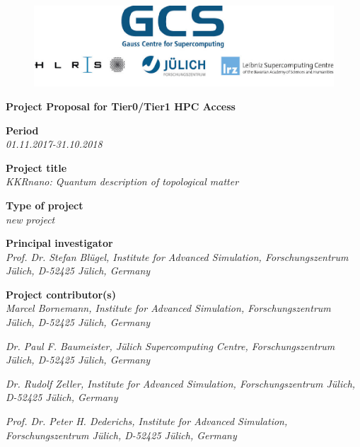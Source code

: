 \documentclass [a4paper, 12pt]{article}
\begin{document}
 
\begin{figure}[H]
\begin{center}
  \includegraphics[scale=0.45]{Figures/GCS-hlrs-fzj-lrz.jpg}\\
\end{center}
\end{figure}

\begin{center}
{\LARGE \bf Project Proposal for Tier0/Tier1 HPC Access} \\

\bigskip
\bigskip
\bigskip
\end{center}
\textbf{Period}\\
\phantom{MM}\textit{01.11.2017-31.10.2018}

\bigskip
\textbf{Project title}\\
\phantom{MM}\textit{KKRnano: Quantum description of topological matter}

\bigskip
\textbf{Type of project}\\
\phantom{MM} \textit{new project}


\bigskip
\textbf{Principal investigator}\\
\phantom{MM} \textit{ Prof. Dr. Stefan Bl{\"u}gel,
Institute for Advanced Simulation, Forschungszentrum J\"ulich, D-52425 J\"ulich, Germany
}

\bigskip
\textbf{Project contributor(s)}\\

\phantom{MM} \textit{Marcel Bornemann,
Institute for Advanced Simulation, Forschungszentrum J\"ulich, D-52425 J\"ulich, Germany
}

\phantom{MM} \textit{Dr. Paul F. Baumeister,
J\"ulich Supercomputing Centre, Forschungszentrum J\"ulich, D-52425 J\"ulich, Germany
}


\phantom{MM} \textit{Dr. Rudolf Zeller,
Institute for Advanced Simulation, Forschungszentrum J\"ulich, D-52425 J\"ulich, Germany
}

\phantom{MM} \textit{Prof. Dr. Peter H. Dederichs,
Institute for Advanced Simulation, Forschungszentrum J\"ulich, D-52425 J\"ulich, Germany
}
\end{document}
